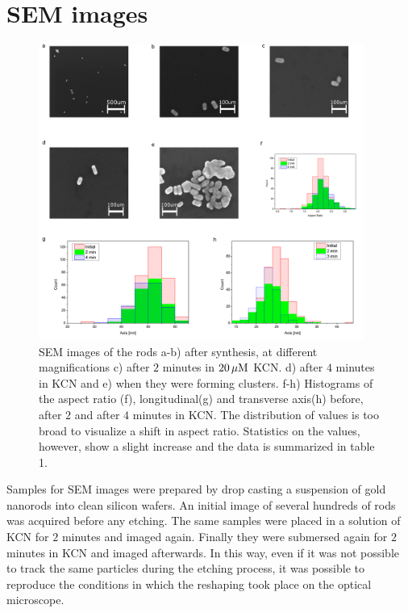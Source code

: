 \newpage

\section{SEM images}
\label{KCN_SEM}
\begin{figure}[tp]
 \centering
 \includegraphics[width=0.95\textwidth]{Chapters/02_KCN/Figures/04_Supporting/02_SEM/sem.png}
 \caption{SEM images of the rods a-b) after synthesis, at different
 magnifications c) after $2$ minutes in $20\,\mu\textrm{M}$ KCN. d) after $4$ minutes in KCN
 and e) when they were forming clusters. f-h) Histograms of the aspect ratio
 (f), longitudinal(g) and transverse axis(h) before, after $2$ and after $4$
 minutes in KCN. The distribution of values is too broad to visualize a shift in
 aspect ratio.
 Statistics on the values, however, show a slight increase and the data is
 summarized in table 1. }
 \label{fig:SEM}
\end{figure}

Samples for SEM images were prepared by drop casting a suspension of gold
nanorods into clean silicon wafers. An initial image of several hundreds of rods
was acquired before any etching. The same samples were placed in a solution of KCN
for $2$ minutes and imaged again. Finally they were submersed again for $2$
minutes in KCN and imaged afterwards. In this way, even if it was not possible
to track the same particles during the etching process, it was possible to
reproduce the conditions in which the reshaping took place on the optical
microscope.

